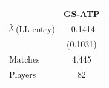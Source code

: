 \begin{tabular}{lc}
\toprule
 & GS-ATP \\
\midrule
$\hat{\delta}$ (LL entry) & -0.1414 \\
 & (0.1031) \\
\midrule
Matches & 4,445 \\
Players & 82 \\
\bottomrule
\end{tabular}
